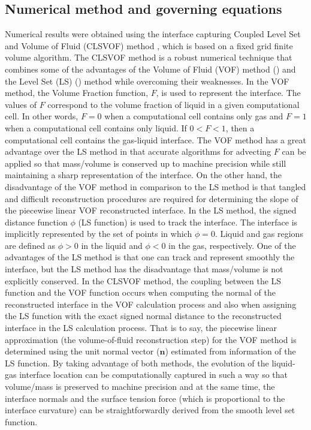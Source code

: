 \documentclass[%
 reprint,
 showkeys,
 amsmath,amssymb,
 aps,
 prfluids,
 onecolumn
]{revtex4-2}
\begin{document}
\subsection{Numerical method and governing equations}
Numerical results were obtained using the {\color{red} interface capturing}
Coupled Level Set and Volume of Fluid (CLSVOF) method
\cite{SusPuc00,SUSSMAN2007469}, which is based on a fixed grid finite volume
algorithm.  {\color{red}The CLSVOF method is a robust  numerical  technique
that  combines  some  of  the  advantages  of the Volume of Fluid (VOF) method
(\cite{HirNic81}) and the Level Set (LS) (\cite{SusSmeOsh94}) method while
overcoming their weaknesses.  In the VOF method,  the Volume Fraction function,
$F$, is used to represent the interface. The values of $F$ correspond to the
volume fraction of liquid in a given computational cell.  In other words, $F =
0$ when a computational cell contains only gas and $F = 1$ when a computational
cell contains only liquid.  If $0 < F < 1$, then a computational cell contains
the gas-liquid interface. The VOF method has a great advantage over the LS
method in that accurate algorithms for advecting $F$ can be applied so that
mass/volume is conserved up to machine precision while still maintaining a
sharp representation of the interface.  On the other hand, the disadvantage of
the VOF method in comparison to the LS method is that tangled and difficult
reconstruction procedures are required for determining the slope of the
piecewise linear VOF reconstructed interface.  In the LS method, the signed
distance function $\phi$ (LS function) is used to track the interface. The
interface is implicitly represented by the set of points in which $\phi = 0$.
Liquid and gas regions are defined as $\phi > 0$ in the liquid and $\phi < 0$
in the gas, respectively.  One of the advantages of the LS method is that one
can track and represent smoothly the interface, but the LS method has the
disadvantage that mass/volume is not explicitly conserved.  In the CLSVOF
method, the coupling between the LS function and the VOF function occurs when
computing the normal of the reconstructed interface in the VOF calculation
process and also when assigning the LS function with the exact signed normal
distance to the reconstructed interface in the LS calculation process. That is
to say, the piecewise linear approximation (the volume-of-fluid reconstruction
step) for the VOF method is determined using the unit normal vector ($\bm n$)
estimated from information of the LS function. By taking advantage of both
methods, the evolution of the liquid-gas interface location can be
computationally captured in such a way so that volume/mass is preserved to
machine precision and at the same time, the interface normals and the surface
tension force (which is proportional to the interface curvature) can be
straightforwardly derived from the smooth level set function. }
\end{document}
